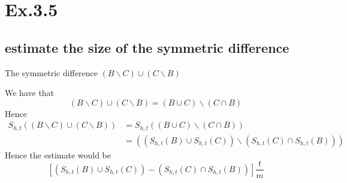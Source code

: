 \section*{Ex.3.5}
\subsection*{estimate the size of the symmetric difference}
The symmetric difference $(B\backslash C)\cup (C \backslash B)$

We have that 
$$
(B\backslash C)\cup (C \backslash B) = (B \cup C)\backslash (C \cap B)
$$
Hence
\begin{align*}
S_{h,t}((B\backslash C)\cup (C \backslash B)) 
  &= S_{h,t}((B \cup C)\backslash (C \cap B))\\
  &= ((S_{h,t}(B) \cup S_{h,t}(C))\backslash (S_{h,t}(C) \cap S_{h,t}(B)))
\end{align*}
Hence the estimate would be
$$
[(S_{h,t}(B) \cup S_{h,t}(C)) - (S_{h,t}(C) \cap S_{h,t}(B))]\frac{t}{m}
$$